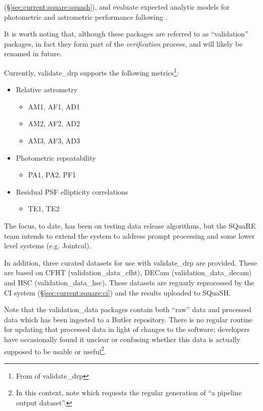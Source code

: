 \documentclass[DM,authoryear,toc,lsstdraft]{lsstdoc}
\begin{document}
(\S\ref{sec:current:square:squash}), and evaluate expected analytic models for
photometric and astrometric performance following \cite{2008arXiv0805.2366I}.

It is worth noting that, although these packages are referred to as
``validation'' packages, in fact they form part of the \textit{verification}
process, and will likely be renamed in future.

Currently, validate\_drp supports the following \glspl{metric}\footnote{From
 of validate\_drp }:

\begin{itemize}
\item{Relative astrometry
  \begin{itemize}
    \item{AM1, AF1, AD1}
    \item{AM2, AF2, AD2}
    \item{AM3, AF3, AD3}
  \end{itemize}
}
\item{Photometric repeatability
  \begin{itemize}
    \item{PA1, PA2, PF1}
  \end{itemize}
}
\item{Residual PSF ellipticity correlations
  \begin{itemize}
    \item{TE1, TE2}
  \end{itemize}
}
\end{itemize}

The focus, to date, has been on testing data release algorithms, but the
SQuaRE team intends to extend the system to address prompt processing and some
lower level systems (e.g. Jointcal).

In addition, three curated datasets for use with validate\_drp are provided.
These are based on CFHT (validation\_data\_cfht), DECam
(validation\_data\_decam) and HSC (validation\_data\_hsc). These datasets are
reguarly reprocessed by the CI system (\S\ref{sec:current:square:ci}) and the
results uploaded to SQuaSH.

Note that the validation\_data packages contain both ``raw'' data and
processed data which has been ingested to a Butler repository. There is no
regular routine for updating that processed data in light of changes to the
software; developers have occasionally found it unclear or confusing whether
this data is actually supposed to be usable or useful\footnote{In this
context, note  which requests the regular generation of ``a
pipeline output dataset''.}.
\end{document}
